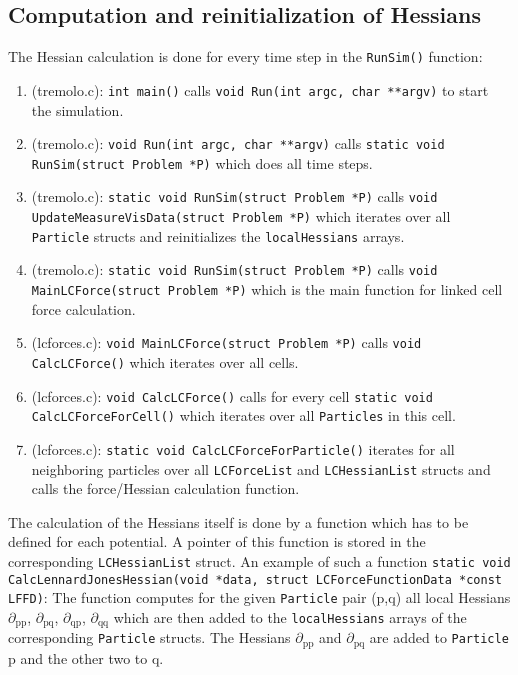\documentclass[11pt]{article}
\begin{document}
\subsection{Computation and reinitialization of Hessians}
\label{sec-1-4}
The Hessian calculation is done for every time step in the \texttt{RunSim()} function:
\begin{enumerate}
\item (tremolo.c): \texttt{int main()} calls \texttt{void Run(int argc, char **argv)} to start the simulation.
\item (tremolo.c): \texttt{void Run(int argc, char **argv)} calls \texttt{static void RunSim(struct Problem *P)} which does all time steps.
\item (tremolo.c): \texttt{static void RunSim(struct Problem *P)} calls \texttt{void UpdateMeasureVisData(struct Problem *P)} which iterates over all \texttt{Particle} structs and reinitializes the \texttt{localHessians} arrays.
\item (tremolo.c): \texttt{static void RunSim(struct Problem *P)} calls \texttt{void MainLCForce(struct Problem *P)} which is the main function for linked cell force calculation.
\item (lcforces.c): \texttt{void MainLCForce(struct Problem *P)} calls \texttt{void CalcLCForce()} which iterates over all cells.
\item (lcforces.c): \texttt{void CalcLCForce()} calls for every cell \texttt{static void CalcLCForceForCell()} which iterates over all \texttt{Particles} in this cell.
\item (lcforces.c): \texttt{static void CalcLCForceForParticle()} iterates for all neighboring particles over all \texttt{LCForceList} and \texttt{LCHessianList} structs and calls the force/Hessian calculation function.
\end{enumerate}
The calculation of the Hessians itself is done by a function which has to be defined for each potential. A pointer of this function is stored in the corresponding \texttt{LCHessianList} struct.
An example of such a function \texttt{static void CalcLennardJonesHessian(void *data, struct LCForceFunctionData *const LFFD)}:
The function computes for the given \texttt{Particle} pair (p,q) all local Hessians $\partial$$_{\text{pp}}$, $\partial$$_{\text{pq}}$, $\partial$$_{\text{qp}}$, $\partial$$_{\text{qq}}$ which are then added to the \texttt{localHessians} arrays of the corresponding \texttt{Particle} structs.
The Hessians $\partial$$_{\text{pp}}$ and $\partial$$_{\text{pq}}$ are added to \texttt{Particle} p and the other two to q.
\end{document}
